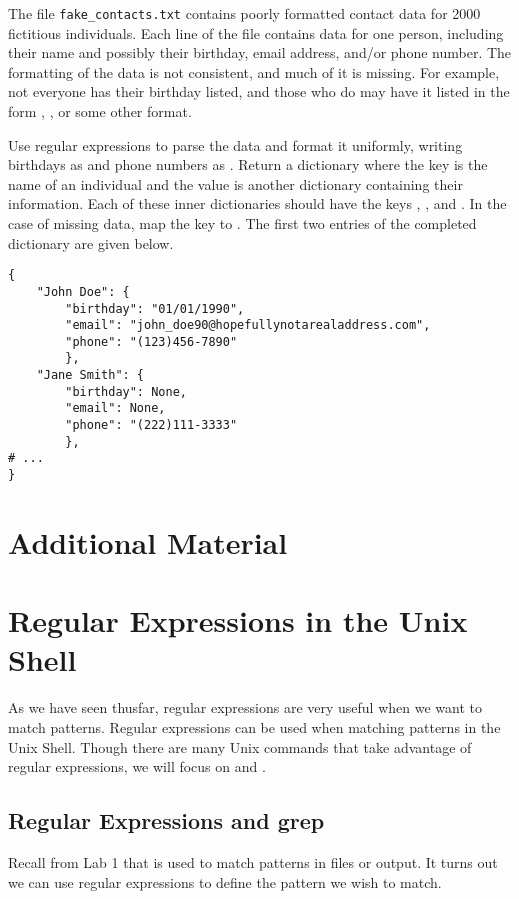 \begin{problem}
The file \texttt{fake\_contacts.txt} contains poorly formatted contact data for 2000 fictitious individuals.
Each line of the file contains data for one person, including their name and possibly their birthday, email address, and/or phone number.
The formatting of the data is not consistent, and much of it is missing.
For example, not everyone has their birthday listed, and those who do may have it listed in the form , , or some other format.

Use regular expressions to parse the data and format it uniformly, writing birthdays as  and phone numbers as .
Return a dictionary where the key is the name of an individual and the value is another dictionary containing their information.
Each of these inner dictionaries should have the keys , , and .
In the case of missing data, map the key to .
The first two entries of the completed dictionary are given below.

\begin{lstlisting}
{
    "John Doe": {
        "birthday": "01/01/1990",
        "email": "john_doe90@hopefullynotarealaddress.com",
        "phone": "(123)456-7890"
        },
    "Jane Smith": {
        "birthday": None,
        "email": None,
        "phone": "(222)111-3333"
        },
# ...
}
\end{lstlisting}
\end{problem}

\newpage

\section*{Additional Material} %

\section*{Regular Expressions in the Unix Shell}
As we have seen thusfar, regular expressions are very useful when we want to match patterns. Regular expressions can be used when matching patterns in the Unix Shell. Though there are many Unix commands that take advantage of regular expressions, we will focus on  and .

\subsection*{Regular Expressions and grep}
Recall from Lab 1 that  is used to match patterns in files or output. It turns out we can use regular expressions to define the pattern we wish to match.

